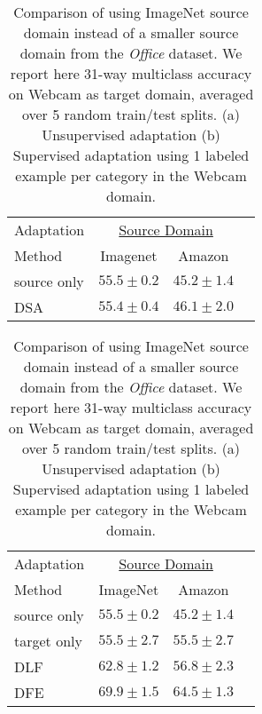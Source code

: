 \begin{table}
\begin{subtable}{0.4\linewidth}
\centering
\begin{tabular}{lccc}
\toprule
Adaptation & \multicolumn{2}{c}{\underline{Source Domain}} \\
Method  & Imagenet & Amazon \\
\midrule
source only & $55.5 \pm 0.2$ & $45.2 \pm 1.4$ \\
\midrule
DSA  & $55.4 \pm 0.4$ & $46.1 \pm 2.0$ \\
\bottomrule
\end{tabular}
\caption{Unsupervised Adaptation}
\label{table:imgnet_unsuper}
\end{subtable}
\hfill
\begin{subtable}{.5\linewidth}
\centering
\hspace{1cm}
\begin{tabular}{lcc c}
\toprule
Adaptation & \multicolumn{2}{c}{\underline{Source Domain}} \\
Method & ImageNet & Amazon \\
\midrule
source only  & $55.5 \pm 0.2$ & $45.2 \pm 1.4$ \\
target only  & $55.5 \pm 2.7$ & $55.5 \pm 2.7$ \\
\midrule
DLF & $62.8 \pm 1.2$ & $56.8 \pm 2.3$ \\
DFE & {$\bm{69.9 \pm 1.5}$} & $64.5 \pm 1.3$ \\
\bottomrule
\end{tabular}
\caption{Supervised Adaptation (One-Shot Adaptation)}
\label{table:imgnet_super}
\end{subtable}
\caption{Comparison of using ImageNet source domain instead of a smaller source domain from the \emph{Office} dataset. We report here 31-way multiclass accuracy on Webcam as target domain, averaged over 5 random train/test splits. (a) Unsupervised adaptation (b) Supervised adaptation using 1 labeled example per category in the Webcam domain.}
\label{tab:imagenet_fc8}
\end{table}
